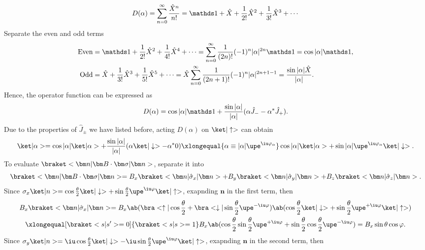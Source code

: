 \begin{solution}
\begin{enumext}
    \[
      D(\alpha) = \sum_{n=0}^\infty \frac{\hat X^n}{n!}
    = \identity + \hat X + \frac1{2!} \hat X^2 + \frac1{3!} \hat X^3 + \cdots
    \]
    Separate the even and odd terms
    \begin{align*}
      \text{Even} &
    = \identity + \frac1{2!} \hat X^2 + \frac1{4!} \hat X^4 + \cdots
    = \sum_{n=0}^\infty \frac1{(2n)!} (-1)^n |\alpha|^{2n} \identity
    = \cos |\alpha| \identity,\\
      \text{Odd} &
    = \hat X + \frac1{3!} \hat X^3 + \frac1{5!} \hat X^5 + \cdots
    = \hat X \sum_{n=0}^\infty \frac1{(2n + 1)!} (-1)^n |\alpha|^{2n+1-1}
    = \frac{\sin |\alpha| \hat X}{|\alpha|}.
    \end{align*}
    Hence, the operator function can be expressed as
    \[
      D(\alpha) = \cos |\alpha| \identity + \frac{\sin |\alpha|}{|\alpha|}
        (\alpha \hat J_- - \alpha^* \hat J_+).
    \]
    Due to the properties of $\hat J_\pm$ we have listed before,
    acting $D(\alpha)$ on $\ket|\uparrow>$ can obtain
    \[
      \ket|\alpha> = \cos |\alpha| \ket|\alpha> + \frac{\sin |\alpha|}{|\alpha|}
        (\alpha \ket|\downarrow> - \alpha^* 0)
      \xlongequal{\alpha \equiv |\alpha| \upe^{\iu\varphi_\alpha}}
        \cos |\alpha| \ket|\alpha>
        + \sin |\alpha| \upe^{\iu\varphi_\alpha} \ket|\downarrow>.
    \]
    To evaluate $\braket<\bm n|\bm B \cdot \bm \sigma|\bm n>$, separate it into
    \[
      \braket<\bm n|\bm B \cdot \bm \sigma|\bm n>
    = B_x\braket<\bm n|\hat \sigma_x|\bm n>
    + B_y\braket<\bm n|\hat \sigma_y|\bm n>
    + B_z\braket<\bm n|\hat \sigma_z|\bm n>.
    \]
    Since $\sigma_x\ket|n> = \cos\frac\theta2 \ket|\downarrow>
        + \sin\frac\theta2\upe^{\iu\varphi}\ket|\uparrow>$,
    exapnding $\bm n$ in the first term, then
    \begin{multline*}
      B_x\braket<\bm n|\hat \sigma_x|\bm n>
    = B_x\ab(\bra<\uparrow|\cos\frac\theta2
        + \bra<\downarrow|\sin\frac\theta2 \upe^{-\iu\varphi})
          \ab(\cos\frac\theta2\ket|\downarrow>
        + \sin\frac\theta2 \upe^{+\iu\varphi} \ket|\uparrow>)\\
    \xlongequal[\braket<s|s'> = 0]{\braket<s|s> = 1} B_x \ab(
      \cos\frac\theta2 \sin\frac\theta2 \upe^{+\iu\varphi}
    + \sin\frac\theta2 \cos\frac\theta2 \upe^{-\iu\varphi})
    = B_x \sin\theta \cos\varphi.
    \end{multline*}
    Since $\sigma_y\ket|n> = \iu\cos\frac\theta2 \ket|\downarrow>
        - \iu \sin\frac\theta2\upe^{\iu\varphi}\ket|\uparrow>$,
    exapnding $\bm n$ in the second term, then

\end{enumext}
\end{solution}
